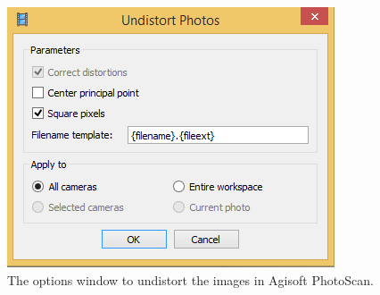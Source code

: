 \documentclass[11pt]{article}
\begin{document}
  \begin{figure}[h]
 	\begin{center}
 		\includegraphics[width=8 cm]{images/undistortPhotos_PS.png}
 	\end{center}
 	\caption{The options window to undistort the images in Agisoft PhotoScan.}
 	\label{fig:undistortPhotos}
 \end{figure}

%
%
%
%
%
%
% 
%
%


\end{document}

